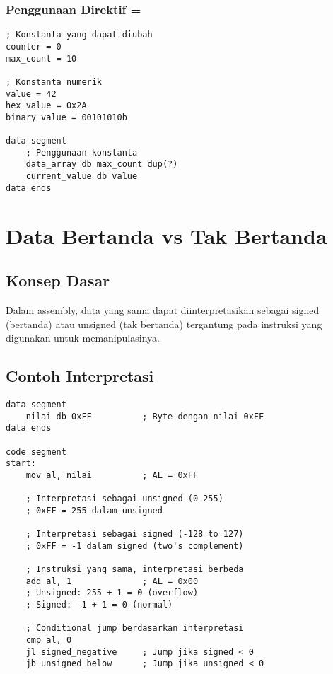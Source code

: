 \documentclass[../main.tex]{subfiles}
\begin{document}
\subsubsection{Penggunaan Direktif =}
\begin{lstlisting}[language={[x86masm]Assembler}, caption=Penggunaan Direktif =, label={lst:equal-examples}]
; Konstanta yang dapat diubah
counter = 0
max_count = 10

; Konstanta numerik
value = 42
hex_value = 0x2A
binary_value = 00101010b

data segment
    ; Penggunaan konstanta
    data_array db max_count dup(?)
    current_value db value
data ends
\end{lstlisting}

\section{Data Bertanda vs Tak Bertanda}

\subsection{Konsep Dasar}
Dalam assembly, data yang sama dapat diinterpretasikan sebagai signed (bertanda) atau unsigned (tak bertanda) tergantung pada instruksi yang digunakan untuk memanipulasinya.

\subsection{Contoh Interpretasi}
\begin{lstlisting}[language={[x86masm]Assembler}, caption=Interpretasi Signed vs Unsigned, label={lst:signed-unsigned}]
data segment
    nilai db 0xFF          ; Byte dengan nilai 0xFF
data ends

code segment
start:
    mov al, nilai          ; AL = 0xFF
    
    ; Interpretasi sebagai unsigned (0-255)
    ; 0xFF = 255 dalam unsigned
    
    ; Interpretasi sebagai signed (-128 to 127)
    ; 0xFF = -1 dalam signed (two's complement)
    
    ; Instruksi yang sama, interpretasi berbeda
    add al, 1              ; AL = 0x00
    ; Unsigned: 255 + 1 = 0 (overflow)
    ; Signed: -1 + 1 = 0 (normal)
    
    ; Conditional jump berdasarkan interpretasi
    cmp al, 0
    jl signed_negative     ; Jump jika signed < 0
    jb unsigned_below      ; Jump jika unsigned < 0
\end{lstlisting}
\end{document}
